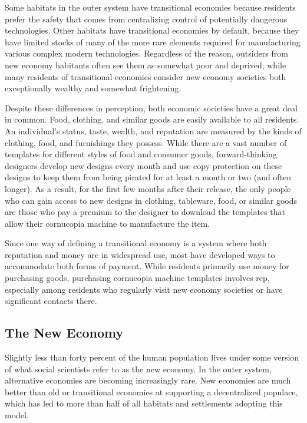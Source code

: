 Some habitats in the outer system have transitional economies because residents prefer the safety 
that comes from centralizing control of potentially 
dangerous technologies. Other habitats have transitional economies by default, because they have limited 
stocks of many of the more rare elements required 
for manufacturing various complex modern technologies. Regardless of the reason, outsiders from new 
economy habitants often see them as somewhat poor 
and deprived, while many residents of transitional 
economies consider new economy societies both exceptionally wealthy and somewhat frightening.

Despite these differences in perception, both economic societies have a great deal in common. Food, 
clothing, and similar goods are easily available to 
all residents. An individual's status, taste, wealth, 
and reputation are measured by the kinds of clothing, food, and furnishings they possess. While there 
are a vast number of templates for different styles of 
food and consumer goods, forward-thinking designers develop new designs every month and use copy 
protection on these designs to keep them from being 
pirated for at least a month or two (and often longer). 
As a result, for the first few months after their release, 
the only people who can gain access to new designs in 
clothing, tableware, food, or similar goods are those 
who pay a premium to the designer to download the 
templates that allow their cornucopia machine to 
manufacture the item.

Since one way of defining a transitional economy 
is a system where both reputation and money are 
in widespread use, most have developed ways to accommodate both forms of payment. While residents 
primarily use money for purchasing goods, purchasing cornucopia machine templates involves rep, 
especially among residents who regularly visit new 
economy societies or have significant contacts there.

\subsection{The New Economy}

Slightly less than forty percent of the human population lives under some version of what social scientists 
refer to as the new economy. In the outer system, alternative economies are becoming increasingly rare. New 
economies are much better than old or transitional 
economies at supporting a decentralized populace, 
which has led to more than half of all habitats and 
settlements adopting this model.

